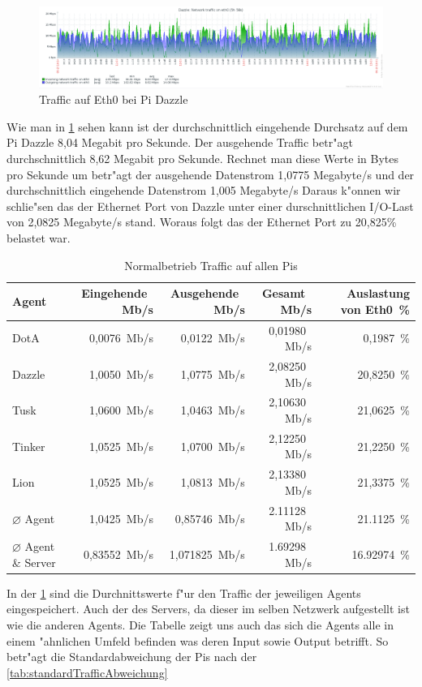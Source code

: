 \begin{figure}[htbp]
\centering
\includegraphics*[width=0.9\linewidth]{Abb/ZabbixDazzle/Standard/DazzleStandard}

\caption{Traffic auf Eth0 bei Pi Dazzle}
\label{fig:Eth0DazzleStandard}
\end{figure}

Wie man in \cref{fig:Eth0DazzleStandard} sehen kann ist der durchschnittlich eingehende Durchsatz auf dem Pi Dazzle 8,04 Megabit %
pro Sekunde. Der ausgehende Traffic betr"agt durchschnittlich 8,62 Megabit pro Sekunde. Rechnet man diese Werte in Bytes pro Sekunde um %
betr"agt der ausgehende Datenstrom 1,0775 Megabyte/s und der durchschnittlich eingehende Datenstrom 1,005 Megabyte/s %
Daraus k"onnen wir schlie"sen das der Ethernet Port von Dazzle unter einer durschnittlichen I/O-Last von 2,0825 Megabyte/s stand. %
Woraus folgt das der Ethernet Port zu 20,825\% belastet war.
\begin{table}
\centering
\begin{tabular}{l%
 r<{\,Mb/s}%
 r<{\,Mb/s}%
 r<{\,Mb/s}%
 r<{\,\%}%
}
Agent  				& Eingehende		& Ausgehende		& Gesamt		& Auslastung von Eth0	\\
\hline
DotA				& 0,0076		& 0,0122		& 0,01980		&  0,1987 		\\
Dazzle 				& 1,0050 		& 1,0775		& 2,08250		& 20,8250		\\
Tusk 				& 1,0600		& 1,0463		& 2,10630		& 21,0625		\\
Tinker				& 1,0525		& 1,0700		& 2,12250		& 21,2250		\\
Lion				& 1,0525		& 1,0813		& 2,13380		& 21,3375		\\ 
$\diameter $ Agent 		& 1,0425		& 0,85746 		& 2.11128		& 21.1125 		\\   
$\diameter $ Agent \& Server 	& 0,83552  		& 1,071825		& 1.69298		& 16.92974		\\

\end{tabular}
\caption{Normalbetrieb Traffic auf allen Pis}
\label{tab:standardTraffic}
\end{table}

In der \cref{tab:standardTraffic} sind die Durchnittswerte f"ur den Traffic der jeweiligen Agents eingespeichert. Auch der %
des Servers, da dieser im selben Netzwerk aufgestellt ist wie die anderen Agents. Die Tabelle zeigt uns auch %
das sich die Agents alle in einem "ahnlichen Umfeld befinden was deren Input sowie Output betrifft. So betr"agt die
Standardabweichung der Pis nach der \cref{tab:standardTrafficAbweichung}     

